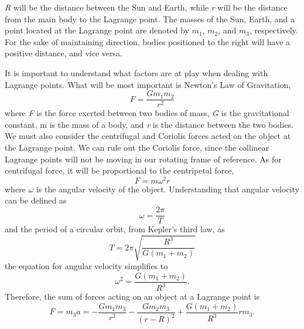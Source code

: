 \documentclass[12pt]{article}
\begin{document}
	\textit{R} will be the distance between the Sun and Earth, while \textit{r} will be the distance from the main body to the Lagrange point. 
	The masses of the Sun, Earth, and a point located at the Lagrange point are denoted by $m_1$, $m_2$, and $m_3$, respectively.
	For the sake of maintaining direction, bodies positioned to the right will have a positive distance, and vice versa.

	It is important to understand what factors are at play when dealing with Lagrange points.
	What will be most important is Newton's Law of Gravitation,
	\begin{equation}
		F = \frac{Gm_1m_2}{r^2}
	\end{equation}
	where \textit{F} is the force exerted between two bodies of mass, \textit{G} is the gravitational constant, m is the mass of a body, and \textit{r} is the distance between the two bodies.
	We must also consider the centrifugal and Coriolis forces acted on the object at the Lagrange point.
	We can rule out the Coriolis force, since the collinear Lagrange points will not be moving in our rotating frame of reference.
	As for centrifugal force, it will be proportional to the centripetal force,
	\begin{equation*}
		F = m\omega^2r
	\end{equation*}
	where $\omega$ is the angular velocity of the object. Understanding that angular velocity can be defined as
	\begin{equation*}
		\omega = \frac{2\pi}{T}
	\end{equation*}
	and the period of a circular orbit, from Kepler's third law, as
	\begin{equation*}
		T = 2\pi\sqrt{\frac{R^3}{G(m_1+m_2)}} %
	\end{equation*}
 	the equation for angular velocity simplifies to
 	\begin{equation*}
 		\omega^2 = \frac{G(m_1+m_2)}{R^3} \text{.} %
 	\end{equation*} %
	Therefore, the sum of forces acting on an object at a Lagrange point is
	\begin{equation*}
		F = m_3a = -\frac{Gm_1m_3}{r^2} - \frac{Gm_2m_3}{(r - R)^2} + \frac{G(m_1+m_2)}{R^3}rm_3 \text{.}
	\end{equation*}
\end{document}
